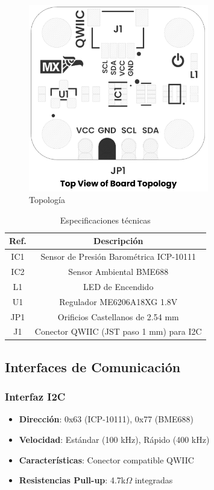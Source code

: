 \documentclass[11pt,a4paper]{article}
\begin{document}
\begin{figure}[H]
\centering
\includegraphics[width=0.7\textwidth]{es_unit_topology_v_1_0_0_icp10111_barometric_pressure_sensor.png}
\caption{Topología}
\label{fig:es-unit-topology-v-1-0-0-icp10111-barometric-pressure-sensor-png}
\end{figure}




\begin{table}[H]
\centering
\small
\begin{tabular}{|c|c|}
\hline
Ref. & Descripción \\
\hline
IC1 & Sensor de Presión Barométrica ICP-10111 \\
IC2 & Sensor Ambiental BME688 \\
L1 & LED de Encendido \\
U1 & Regulador ME6206A18XG 1.8V \\
JP1 & Orificios Castellanos de 2.54 mm \\
J1 & Conector QWIIC (JST paso 1 mm) para I2C \\
\hline
\end{tabular}
\caption{Especificaciones técnicas}
\end{table}


\subsection{Interfaces de Comunicación}

\subsubsection{Interfaz I2C}
\begin{itemize}
\item \textbf{Dirección}: 0x63 (ICP-10111), 0x77 (BME688)
\item \textbf{Velocidad}: Estándar (100 kHz), Rápido (400 kHz)
\item \textbf{Características}: Conector compatible QWIIC
\item \textbf{Resistencias Pull-up}: 4.7k$\Omega$ integradas
\end{itemize}
\end{document}
